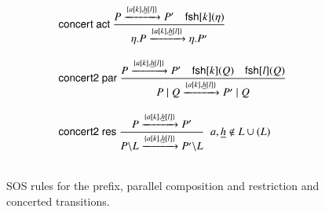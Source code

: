 {\begin{figure}[t] 
\[
\begin{array}{l}
\rulename{concert act}\
\Rule
{P \xrightarrow{\{{a}[k], \underline{h}[l]\}} P' \quad \fresh{k}{\eta}}
{\eta.P \xrightarrow{\{{a}[k], \underline{h}[l]\}} \eta.P'}\\[25pt]
\rulename{concert2 par}\
\Rule
{P \xrightarrow{\{{a}[k], \underline{h}[l]\}} P'\quad \fresh{k}{Q} \quad \fresh{l}{Q}}
{P \paral Q \xrightarrow{\{{a}[k], \underline{h}[l]\}} P' \paral Q}\\[25pt]
\rulename{concert2 res}\
\Rule
{P \xrightarrow{\{{a}[k], \underline{h}[l]\}} P'}
{P\backslash L \xrightarrow{\{{a}[k], \underline{h}[l]\}} P'\backslash L}\;\;  a, \underline{h}  \notin L \cup (L)\\[25pt]
%
\end{array}
\] 
\caption{SOS rules for the prefix, parallel composition and restriction and concerted transitions.
\label{fig:xc2sos} 
}
\end{figure}

}

